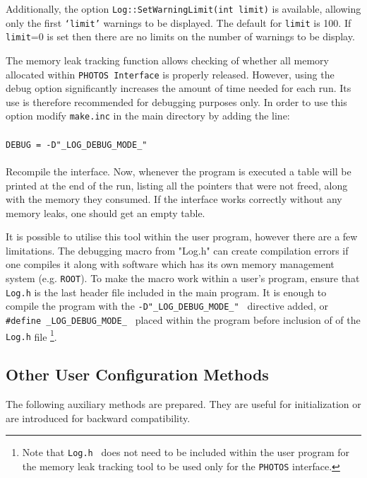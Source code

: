 \documentclass[]{Photos_interface_design}
\begin{document}
Additionally, the option {\tt Log::SetWarningLimit(int limit)} is available, allowing
only the first {\tt `limit'} warnings to be displayed. The default for {\tt limit} is 100. 
If {\tt limit}=0 is set then there are no limits on the number of warnings to be display.

The memory leak tracking function allows checking of whether all memory allocated within {\tt PHOTOS Interface}
 is properly released. However, using the debug option significantly increases the amount of time needed for 
each run. Its  use is therefore recommended  for debugging purposes only. In order to use this option
 modify {\tt make.inc} in the main directory by adding the line: \\
\\ {\tt DEBUG = -D"\_LOG\_DEBUG\_MODE\_" } \\ \\
Recompile the interface.
Now, whenever the program is executed a table will be printed at the end of the run,
listing all the pointers that were not freed, along with the memory they consumed.
If the interface works correctly without any memory leaks, one should get an empty table.

It is possible to utilise this tool within the user program, however there are a few limitations.
The debugging macro from "Log.h" can create compilation errors if one compiles
it along with software which has its own memory management system (e.g. {\tt ROOT}).
To make the macro work within a user's program, ensure that {\tt Log.h} is the last header file
included in the main program.
It is enough to  compile the program with the {\tt -D"\_LOG\_DEBUG\_MODE\_" } directive added,
or {\tt \#define \_LOG\_DEBUG\_MODE\_ } placed within the program before inclusion of
of the {\tt Log.h} file
\footnote{Note that {\tt Log.h } does not need to be included within
the user program  for the memory leak tracking tool to be used only for the {\tt PHOTOS} interface.
}.

\subsection{Other User Configuration Methods}
\label{subsection:other_methods}

The following auxiliary methods are prepared. They are useful for initialization 
or are introduced for backward compatibility.
\end{document}
